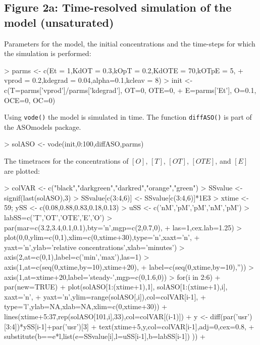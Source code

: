 \documentclass{article}
\begin{document}
\subsection*{Figure 2a: Time-resolved simulation of the model (unsaturated)}
Parameters for the model, the initial concentrations and the time-steps for which the simulation is performed:
\begin{Schunk}
\begin{Sinput}
> parms <- c(Et = 1,KdOT = 0.3,kOpT = 0.2,KdOTE = 70,kOTpE = 5,  
+            vprod = 0.2,kdegrad = 0.04,alpha=0.1,kcleav = 8)
> init <- c(T=parms['vprod']/parms['kdegrad'], OT=0, OTE=0, 
+           E=parms['Et'], O=0.1, OCE=0, OC=0)
\end{Sinput}
\end{Schunk}
Using \texttt{vode()} the model is simulated in time. The function \texttt{diffASO()} is part of the ASOmodels package. 
\begin{Schunk}
\begin{Sinput}
> solASO <- vode(init,0:100,diffASO,parms)
\end{Sinput}
\end{Schunk}
The timetraces for the concentrations of $[O]$, $[T]$, $[OT]$, $[OTE]$, and $[E]$ are plotted:
\begin{Schunk}
\begin{Sinput}
> colVAR <- c("black","darkgreen","darkred","orange","green")  
> SSvalue <- signif(last(solASO),3) 
> SSvalue[c(3:4,6)] <- SSvalue[c(3:4,6)]*1E3
> xtime <- 59; ySS <- c(0.08,0.88,0.83,0.18,0.13)
> uSS <- c('nM','pM','pM','nM','pM')
> labSS=c('T','OT','OTE','E','O')
> par(mar=c(3.2,3.4,0.1,0.1),bty='n',mgp=c(2,0.7,0),
+     las=1,cex.lab=1.25)
> plot(0,0,ylim=c(0,1),xlim=c(0,xtime+30),type='n',xaxt='n',
+      yaxt='n',ylab='relative concentrations',xlab='minutes')
> axis(2,at=c(0,1),label=c('min','max'),las=1)
> axis(1,at=c(seq(0,xtime,by=10),xtime+20),
+      label=c(seq(0,xtime,by=10),''))
> axis(1,at=xtime+20,label='steady-\nstate',mgp=c(0,1.6,0))
> for(i in 2:6){ 
+   par(new=TRUE)
+   plot(solASO[1:(xtime+1),1], solASO[1:(xtime+1),i], xaxt='n',
+        yaxt='n',ylim=range(solASO[,i]),col=colVAR[i-1], 
+        type='l',ylab=NA,xlab=NA,xlim=c(0,xtime+30)) 
+   lines(xtime+5:37,rep(solASO[101,i],33),col=colVAR[(i-1)]) 
+   y <- diff(par('usr')[3:4])*ySS[i-1]+par('usr')[3]
+   text(xtime+5,y,col=colVAR[i-1],adj=0,cex=0.8,
+        substitute(b==e*l,list(e=SSvalue[i],l=uSS[i-1],b=labSS[i-1]) ))
+ }
\end{Sinput}
\end{Schunk}
\end{document}
